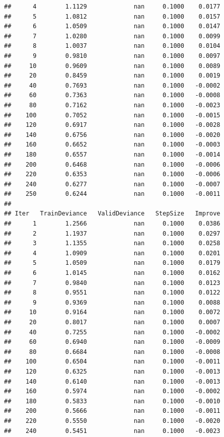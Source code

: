 \documentclass[
]{book}
\begin{document}
\begin{verbatim}
##      4        1.1129             nan     0.1000    0.0177
##      5        1.0812             nan     0.1000    0.0157
##      6        1.0509             nan     0.1000    0.0147
##      7        1.0280             nan     0.1000    0.0099
##      8        1.0037             nan     0.1000    0.0104
##      9        0.9810             nan     0.1000    0.0097
##     10        0.9609             nan     0.1000    0.0089
##     20        0.8459             nan     0.1000    0.0019
##     40        0.7693             nan     0.1000   -0.0002
##     60        0.7363             nan     0.1000   -0.0008
##     80        0.7162             nan     0.1000   -0.0023
##    100        0.7052             nan     0.1000   -0.0015
##    120        0.6917             nan     0.1000   -0.0028
##    140        0.6756             nan     0.1000   -0.0020
##    160        0.6652             nan     0.1000   -0.0003
##    180        0.6557             nan     0.1000   -0.0014
##    200        0.6468             nan     0.1000   -0.0006
##    220        0.6353             nan     0.1000   -0.0006
##    240        0.6277             nan     0.1000   -0.0007
##    250        0.6244             nan     0.1000   -0.0011
## 
## Iter   TrainDeviance   ValidDeviance   StepSize   Improve
##      1        1.2566             nan     0.1000    0.0386
##      2        1.1937             nan     0.1000    0.0297
##      3        1.1355             nan     0.1000    0.0258
##      4        1.0909             nan     0.1000    0.0201
##      5        1.0509             nan     0.1000    0.0179
##      6        1.0145             nan     0.1000    0.0162
##      7        0.9840             nan     0.1000    0.0123
##      8        0.9551             nan     0.1000    0.0122
##      9        0.9369             nan     0.1000    0.0088
##     10        0.9164             nan     0.1000    0.0072
##     20        0.8017             nan     0.1000    0.0007
##     40        0.7255             nan     0.1000   -0.0002
##     60        0.6940             nan     0.1000   -0.0009
##     80        0.6684             nan     0.1000   -0.0008
##    100        0.6504             nan     0.1000   -0.0011
##    120        0.6325             nan     0.1000   -0.0013
##    140        0.6140             nan     0.1000   -0.0013
##    160        0.5974             nan     0.1000   -0.0002
##    180        0.5833             nan     0.1000   -0.0010
##    200        0.5666             nan     0.1000   -0.0011
##    220        0.5550             nan     0.1000   -0.0020
##    240        0.5451             nan     0.1000   -0.0023

\end{verbatim}
\end{document}
